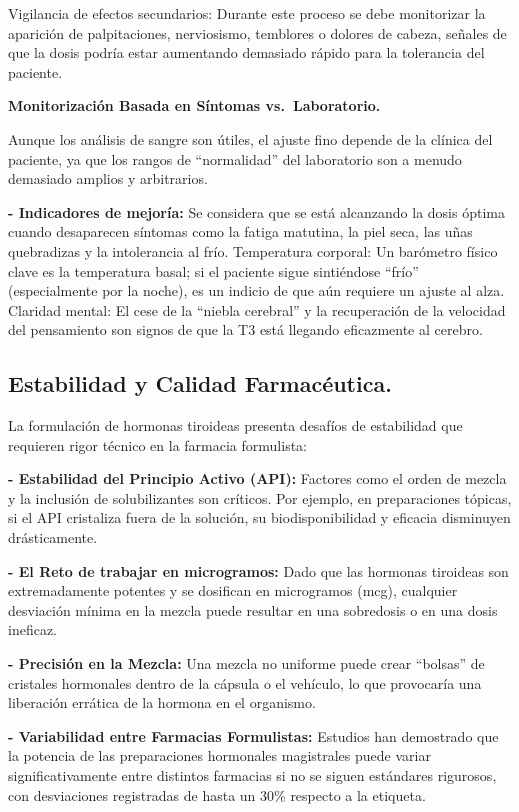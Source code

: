 \documentclass[
  spanish,
]{article}
\begin{document}
Vigilancia de efectos secundarios: Durante este proceso se debe monitorizar la aparición de palpitaciones, nerviosismo, temblores o dolores de cabeza, señales de que la dosis podría estar aumentando demasiado rápido para la tolerancia del paciente.

\textbf{Monitorización Basada en Síntomas vs.~Laboratorio.}

Aunque los análisis de sangre son útiles, el ajuste fino depende de la clínica del paciente, ya que los rangos de ``normalidad'' del laboratorio son a menudo demasiado amplios y arbitrarios.

\textbf{- Indicadores de mejoría:} Se considera que se está alcanzando la dosis óptima cuando desaparecen síntomas como la fatiga matutina, la piel seca, las uñas quebradizas y la intolerancia al frío.
Temperatura corporal: Un barómetro físico clave es la temperatura basal; si el paciente sigue sintiéndose ``frío'' (especialmente por la noche), es un indicio de que aún requiere un ajuste al alza.
Claridad mental: El cese de la ``niebla cerebral'' y la recuperación de la velocidad del pensamiento son signos de que la T3 está llegando eficazmente al cerebro.

\subsection{Estabilidad y Calidad Farmacéutica.}\label{estabilidad-y-calidad-farmacuxe9utica.}

La formulación de hormonas tiroideas presenta desafíos de estabilidad que requieren rigor técnico en la farmacia formulista:

\textbf{- Estabilidad del Principio Activo (API):} Factores como el orden de mezcla y la inclusión de solubilizantes son críticos. Por ejemplo, en preparaciones tópicas, si el API cristaliza fuera de la solución, su biodisponibilidad y eficacia disminuyen drásticamente.

\textbf{- El Reto de trabajar en microgramos:} Dado que las hormonas tiroideas son extremadamente potentes y se dosifican en microgramos (mcg), cualquier desviación mínima en la mezcla puede resultar en una sobredosis o en una dosis ineficaz.

\textbf{- Precisión en la Mezcla:} Una mezcla no uniforme puede crear ``bolsas'' de cristales hormonales dentro de la cápsula o el vehículo, lo que provocaría una liberación errática de la hormona en el organismo.

\textbf{- Variabilidad entre Farmacias Formulistas:} Estudios han demostrado que la potencia de las preparaciones hormonales magistrales puede variar significativamente entre distintos farmacias si no se siguen estándares rigurosos, con desviaciones registradas de hasta un 30\% respecto a la etiqueta.
\end{document}
